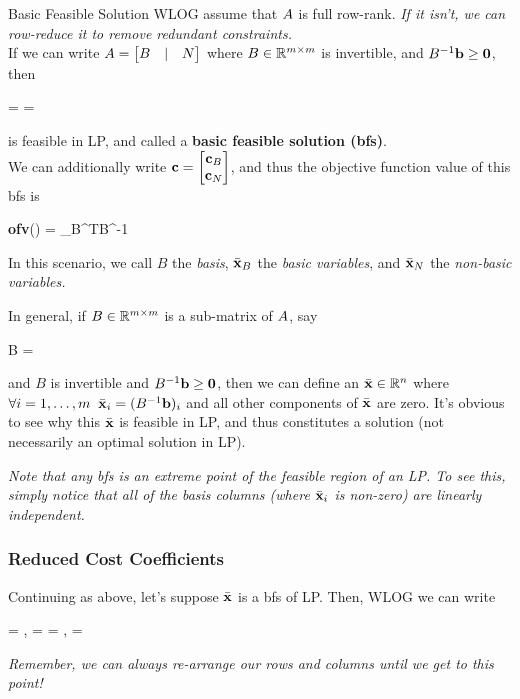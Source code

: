 \begin{defn}{Basic Feasible Solution}{}
WLOG assume that $A$ is full row-rank. 
\textit{If it isn't, we can row-reduce it to
remove redundant constraints.}
\medskip\\
If we can write $A = \begin{bmatrix} B & | & N \end{bmatrix}$ where $B \in \mathbb{R}^{m \times m}$ is
invertible, and $B^{-1}\mathbf{b} \geq \mathbf{0}$, then 
\begin{frml}
	\bx = 
= 
\end{frml}
is feasible in LP, and called a \textbf{basic feasible solution (bfs)}. 
\medskip\\
We can additionally write $\mathbf{c} = \begin{bmatrix} \mathbf{c}_B \\ \mathbf{c}_N \end{bmatrix}$, and thus the objective
function value of this bfs is 
\begin{frml}
	\textbf{ofv}(\bx) = \vc_B^TB^{-1}\vb
\end{frml}
In this scenario, we call $B$ the \textit{basis}, $\bar{\mathbf{x}}_B$ the \textit{basic variables}, 
and $\bar{\mathbf{x}}_N$ the \textit{non-basic variables.}
\end{defn}

In general, if $B \in \mathbb{R}^{m \times m}$ is a sub-matrix of $A$, say
\begin{frml}
	B = 
\end{frml}
and $B$ is invertible and $B^{-1}\mathbf{b} \geq \mathbf{0}$, then we can define an
$\bar{\mathbf{x}} \in \mathbb{R}^n$ where $\forall i = 1, \ldots, m \;\; \bar{\mathbf{x}}_i = (B^{-1}\mathbf{b})_i$ 
and all other components of $\bar{\mathbf{x}}$ are zero. It's obvious to see why
this $\bar{\mathbf{x}}$ is feasible in LP, and thus constitutes a solution (not necessarily
an optimal solution in LP).

\textit{Note that any bfs is an extreme point of the feasible region of an LP. To see
this, simply notice that all of the basis columns (where $\bar{\mathbf{x}}_i$ is non-zero) 
are linearly independent.}

\subsubsection{Reduced Cost Coefficients}

Continuing as above, let's suppose $\bar{\mathbf{x}}$ is a bfs of LP. 
Then, 
WLOG we can write 
		\begin{frml}
			\vA = , 
			\bx =  = , \vc = \mat{\vc_B \\ \vc_N}
		\end{frml}
\textit{Remember, we can always re-arrange our rows and columns until we get to this point!}

